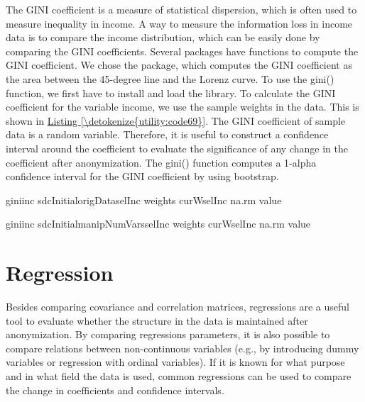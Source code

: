 \documentclass[letterpaper,10pt,english]{sphinxmanual}
\begin{document}
The GINI coefficient is a measure of statistical dispersion, which is
often used to measure inequality in income. A way to measure the
information loss in income data is to compare the income distribution,
which can be easily done by comparing the GINI coefficients. Several 
packages have functions to compute the GINI coefficient. We chose the
 package, which computes the GINI coefficient as the area
between the 45-degree line and the Lorenz curve. To use the gini()
function, we first have to install and load the  library. To
calculate the GINI coefficient for the variable income, we use the
sample weights in the data. This is shown in \hyperref[\detokenize{utility:code69}]{Listing \ref{\detokenize{utility:code69}}}. The GINI
coefficient of sample data is a random variable. Therefore, it is useful
to construct a confidence interval around the coefficient to evaluate
the significance of any change in the coefficient after anonymization.
The gini() function computes a 1-alpha confidence interval for the GINI
coefficient by using bootstrap.

\def\sphinxLiteralBlockLabel{\label{\detokenize{utility:code69}}}
%
\begin{sphinxVerbatim}[commandchars=\\\{\},numbers=left,firstnumber=1,stepnumber=1]
giniinc  sdcInitialorigData\PYG{p}{[}selInc\PYG{p}{]} weights   curW\PYG{p}{[}selInc\PYG{p}{]} na.rm  value 

giniinc  sdcInitialmanipNumVars\PYG{p}{[}selInc\PYG{p}{]} weights  curW\PYG{p}{[}selInc\PYG{p}{]} na.rm  value 
\end{sphinxVerbatim}


\section{Regression}
\label{\detokenize{utility:regression}}
Besides comparing covariance and correlation matrices, regressions are a
useful tool to evaluate whether the structure in the data is maintained
after anonymization. By comparing regressions parameters, it is also
possible to compare relations between non-continuous variables (e.g., by
introducing dummy variables or regression with ordinal variables). If it
is known for what purpose and in what field the data is used, common
regressions can be used to compare the change in coefficients and
confidence intervals.
\end{document}
